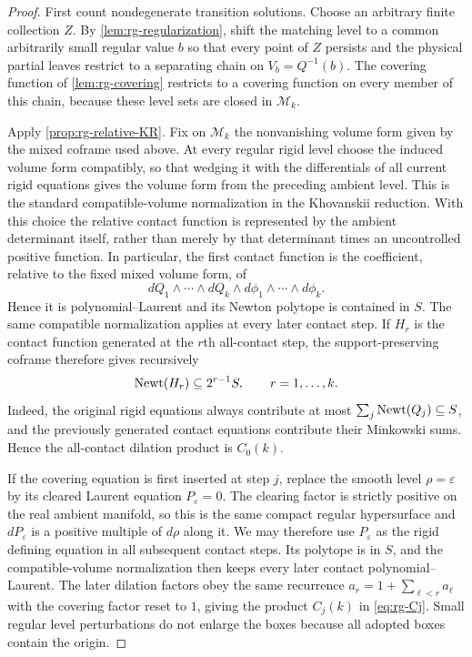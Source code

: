 \begin{proof}
First count nondegenerate transition solutions.  Choose an arbitrary finite
collection $Z$.  By \cref{lem:rg-regularization}, shift the matching level to a
common arbitrarily small regular value $b$ so that every point of $Z$ persists
and the physical partial leaves restrict to a separating chain on
$V_b=Q^{-1}(b)$.  The covering function of \cref{lem:rg-covering} restricts
to a covering function on every member of this chain, because these level
sets are closed in \(\mathcal M_k\).

Apply \cref{prop:rg-relative-KR}.  Fix on $\mathcal M_k$ the nonvanishing
volume form given by the mixed coframe used above.  At every regular rigid
level choose the induced volume form compatibly, so that wedging it with the
differentials of all current rigid equations gives the volume form from the
preceding ambient level.  This is the standard compatible-volume normalization
in the Khovanskii reduction.  With this choice the relative contact function is
represented by the ambient determinant itself, rather than merely by that
determinant times an uncontrolled positive function.  In particular, the first
contact function is the coefficient, relative to the fixed mixed volume form,
of
\[
 dQ_1\wedge\cdots\wedge dQ_k\wedge
 d\phi_1\wedge\cdots\wedge d\phi_k.
\]
Hence it is polynomial--Laurent and its Newton polytope is contained in $S$.
The same compatible normalization applies at every later contact step.  If
$H_r$ is the contact function generated at the $r$th all-contact step, the
support-preserving coframe therefore gives recursively
\begin{equation}\label{eq:rg-contact-support}
 \operatorname{Newt}(H_r)\subseteq2^{r-1}S,
 \qquad r=1,\ldots,k.
\end{equation}
Indeed, the original rigid equations always contribute at most
$\sum_j\operatorname{Newt}(Q_j)\subseteq S$, and the previously generated contact equations
contribute their Minkowski sums.  Hence the all-contact dilation product is
$C_0(k)$.

If the covering equation is first inserted at step $j$, replace the smooth
level $\rho=\varepsilon$ by its cleared Laurent equation
$P_\varepsilon=0$.  The clearing factor is strictly positive on the real
ambient manifold, so this is the same compact regular hypersurface and
$dP_\varepsilon$ is a positive multiple of $d\rho$ along it.  We may therefore
use $P_\varepsilon$ as the rigid defining equation in all subsequent contact
steps.  Its polytope is in $S$, and the compatible-volume normalization then
keeps every later contact polynomial--Laurent.  The later dilation factors obey
the same recurrence $a_r=1+\sum_{\ell<r}a_\ell$ with the covering factor reset
to $1$, giving the product $C_j(k)$ in \eqref{eq:rg-Cj}.  Small regular level
perturbations do not enlarge the boxes because all adopted boxes contain the
origin.


\end{proof}
